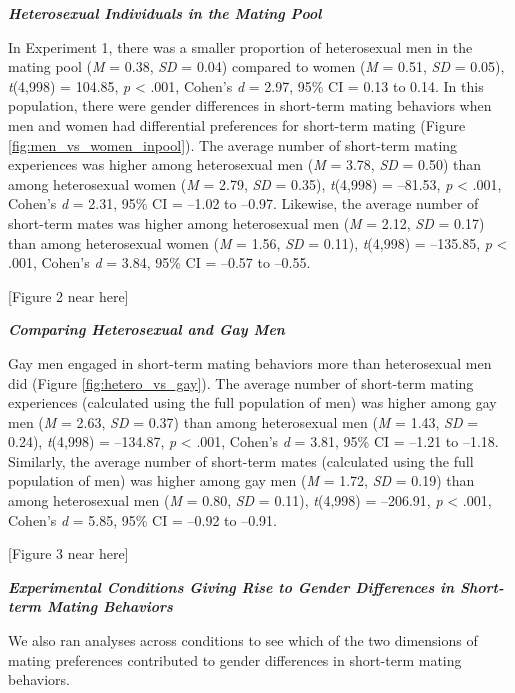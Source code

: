\documentclass[
  12pt,
]{article}
\begin{document}
\textbf{\emph{Heterosexual Individuals in the Mating Pool}}

In Experiment 1, there was a smaller proportion of heterosexual men in
the mating pool (\emph{M} = 0.38, \emph{SD} = 0.04) compared to women
(\emph{M} = 0.51, \emph{SD} = 0.05), \emph{t}(4,998) = 104.85, \emph{p}
\textless{} .001, Cohen's \emph{d} = 2.97, 95\% CI = 0.13 to 0.14. In
this population, there were gender differences in short-term mating
behaviors when men and women had differential preferences for short-term
mating (Figure \ref{fig:men_vs_women_inpool}). The average number of
short-term mating experiences was higher among heterosexual men
(\emph{M} = 3.78, \emph{SD} = 0.50) than among heterosexual women
(\emph{M} = 2.79, \emph{SD} = 0.35), \emph{t}(4,998) = --81.53, \emph{p}
\textless{} .001, Cohen's \emph{d} = 2.31, 95\% CI = --1.02 to --0.97.
Likewise, the average number of short-term mates was higher among
heterosexual men (\emph{M} = 2.12, \emph{SD} = 0.17) than among
heterosexual women (\emph{M} = 1.56, \emph{SD} = 0.11), \emph{t}(4,998)
= --135.85, \emph{p} \textless{} .001, Cohen's \emph{d} = 3.84, 95\% CI
= --0.57 to --0.55.

{[}Figure 2 near here{]}

\textbf{\emph{Comparing Heterosexual and Gay Men}}

Gay men engaged in short-term mating behaviors more than heterosexual
men did (Figure \ref{fig:hetero_vs_gay}). The average number of
short-term mating experiences (calculated using the full population of
men) was higher among gay men (\emph{M} = 2.63, \emph{SD} = 0.37) than
among heterosexual men (\emph{M} = 1.43, \emph{SD} = 0.24),
\emph{t}(4,998) = --134.87, \emph{p} \textless{} .001, Cohen's \emph{d}
= 3.81, 95\% CI = --1.21 to --1.18. Similarly, the average number of
short-term mates (calculated using the full population of men) was
higher among gay men (\emph{M} = 1.72, \emph{SD} = 0.19) than among
heterosexual men (\emph{M} = 0.80, \emph{SD} = 0.11), \emph{t}(4,998) =
--206.91, \emph{p} \textless{} .001, Cohen's \emph{d} = 5.85, 95\% CI =
--0.92 to --0.91.

{[}Figure 3 near here{]}

\textbf{\emph{Experimental Conditions Giving Rise to Gender Differences
in Short-term Mating Behaviors}}

We also ran analyses across conditions to see which of the two
dimensions of mating preferences contributed to gender differences in
short-term mating behaviors.
\end{document}
